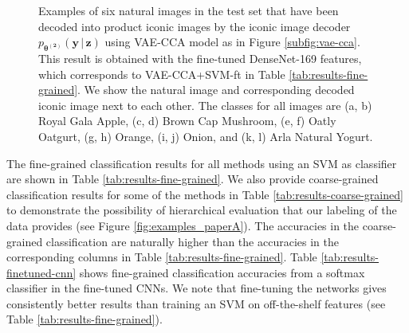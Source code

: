 \begin{figure}[t]
\begin{subfigure}[b]{0.14\textwidth}
		\caption{}
		\label{subfig:yogurt-decoded}
	\end{subfigure}
	\vspace{-2mm}
	\caption{ 
	Examples of six natural images in the test set that have been decoded into product iconic images by the iconic image decoder $p_{\boldsymbol{\theta^{(2)}}}(\mathbf{y}\,|\,\mathbf{z})$ using VAE-CCA model as in Figure \ref{subfig:vae-cca}. This result is obtained with the fine-tuned DenseNet-169 features, which corresponds to VAE-CCA+SVM-ft in Table \ref{tab:results-fine-grained}. 
	We show the natural image and corresponding decoded iconic image next to each other. The classes for all images are (a, b) Royal Gala Apple, (c, d) Brown Cap Mushroom, (e, f) Oatly Oatgurt, (g, h) Orange, (i, j) Onion, and (k, l) Arla Natural Yogurt.
	} 
	\label{fig:decoded-images}
	\vspace{-3mm}
\end{figure}



The fine-grained classification results for all methods using an SVM as classifier are shown in Table \ref{tab:results-fine-grained}. We also provide coarse-grained classification results for some of the methods in Table \ref{tab:results-coarse-grained} to demonstrate the possibility of hierarchical evaluation that our labeling of the data provides (see Figure \ref{fig:examples_paperA}). %
The accuracies in the coarse-grained classification are naturally higher than the accuracies in the corresponding columns in Table \ref{tab:results-fine-grained}. Table \ref{tab:results-finetuned-cnn} shows fine-grained classification accuracies from a softmax classifier in the fine-tuned CNNs. We note that fine-tuning the networks gives consistently better results than training an SVM on off-the-shelf features (see Table \ref{tab:results-fine-grained}).

